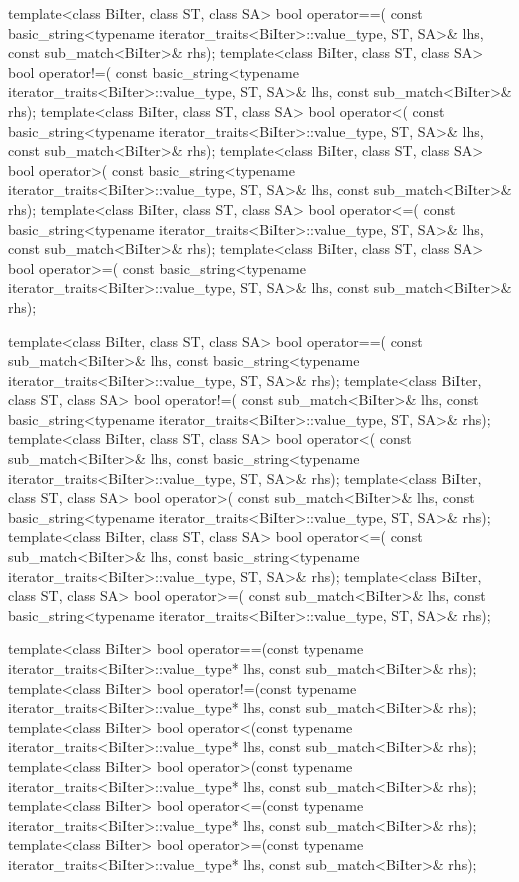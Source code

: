 \begin{codeblock}
{  template<class BiIter, class ST, class SA>
    bool operator==(
      const basic_string<typename iterator_traits<BiIter>::value_type, ST, SA>& lhs,
      const sub_match<BiIter>& rhs);
  template<class BiIter, class ST, class SA>
    bool operator!=(
      const basic_string<typename iterator_traits<BiIter>::value_type, ST, SA>& lhs,
      const sub_match<BiIter>& rhs);
  template<class BiIter, class ST, class SA>
    bool operator<(
      const basic_string<typename iterator_traits<BiIter>::value_type, ST, SA>& lhs,
      const sub_match<BiIter>& rhs);
  template<class BiIter, class ST, class SA>
    bool operator>(
      const basic_string<typename iterator_traits<BiIter>::value_type, ST, SA>& lhs,
      const sub_match<BiIter>& rhs);
  template<class BiIter, class ST, class SA>
    bool operator<=(
      const basic_string<typename iterator_traits<BiIter>::value_type, ST, SA>& lhs,
      const sub_match<BiIter>& rhs);
  template<class BiIter, class ST, class SA>
    bool operator>=(
      const basic_string<typename iterator_traits<BiIter>::value_type, ST, SA>& lhs,
      const sub_match<BiIter>& rhs);

  template<class BiIter, class ST, class SA>
    bool operator==(
      const sub_match<BiIter>& lhs,
      const basic_string<typename iterator_traits<BiIter>::value_type, ST, SA>& rhs);
  template<class BiIter, class ST, class SA>
    bool operator!=(
      const sub_match<BiIter>& lhs,
      const basic_string<typename iterator_traits<BiIter>::value_type, ST, SA>& rhs);
  template<class BiIter, class ST, class SA>
    bool operator<(
      const sub_match<BiIter>& lhs,
      const basic_string<typename iterator_traits<BiIter>::value_type, ST, SA>& rhs);
  template<class BiIter, class ST, class SA>
    bool operator>(
      const sub_match<BiIter>& lhs,
      const basic_string<typename iterator_traits<BiIter>::value_type, ST, SA>& rhs);
  template<class BiIter, class ST, class SA>
    bool operator<=(
      const sub_match<BiIter>& lhs,
      const basic_string<typename iterator_traits<BiIter>::value_type, ST, SA>& rhs);
  template<class BiIter, class ST, class SA>
    bool operator>=(
      const sub_match<BiIter>& lhs,
      const basic_string<typename iterator_traits<BiIter>::value_type, ST, SA>& rhs);

  template<class BiIter>
    bool operator==(const typename iterator_traits<BiIter>::value_type* lhs,
                    const sub_match<BiIter>& rhs);
  template<class BiIter>
    bool operator!=(const typename iterator_traits<BiIter>::value_type* lhs,
                    const sub_match<BiIter>& rhs);
  template<class BiIter>
    bool operator<(const typename iterator_traits<BiIter>::value_type* lhs,
                   const sub_match<BiIter>& rhs);
  template<class BiIter>
    bool operator>(const typename iterator_traits<BiIter>::value_type* lhs,
                   const sub_match<BiIter>& rhs);
  template<class BiIter>
    bool operator<=(const typename iterator_traits<BiIter>::value_type* lhs,
                    const sub_match<BiIter>& rhs);
  template<class BiIter>
    bool operator>=(const typename iterator_traits<BiIter>::value_type* lhs,
                    const sub_match<BiIter>& rhs);

}
\end{codeblock}
